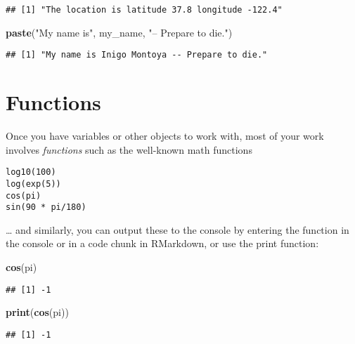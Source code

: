 \documentclass[
]{book}
\newenvironment{Shaded}{\begin{snugshade}}{\end{snugshade}}
\newcommand{\KeywordTok}[1]{\textcolor[rgb]{0.13,0.29,0.53}{\textbf{#1}}}
\newcommand{\NormalTok}[1]{#1}
\newcommand{\StringTok}[1]{\textcolor[rgb]{0.31,0.60,0.02}{#1}}
\begin{document}
\begin{verbatim}
## [1] "The location is latitude 37.8 longitude -122.4"
\end{verbatim}

\begin{Shaded}
\begin{Highlighting}[]
\KeywordTok{paste}\NormalTok{(}\StringTok{"My name is"}\NormalTok{, my_name, }\StringTok{"-- Prepare to die."}\NormalTok{)}
\end{Highlighting}
\end{Shaded}

\begin{verbatim}
## [1] "My name is Inigo Montoya -- Prepare to die."
\end{verbatim}

\hypertarget{functions}{%
\section{Functions}\label{functions}}

Once you have variables or other objects to work with, most of your work
involves \emph{functions} such as the well-known math functions

\begin{verbatim}
log10(100)
log(exp(5))
cos(pi)
sin(90 * pi/180)
\end{verbatim}

\ldots{} and similarly, you can output these to the console by entering the function
in the console or in a code chunk in RMarkdown, or use the print function:

\begin{Shaded}
\begin{Highlighting}[]
\KeywordTok{cos}\NormalTok{(pi)}
\end{Highlighting}
\end{Shaded}

\begin{verbatim}
## [1] -1
\end{verbatim}

\begin{Shaded}
\begin{Highlighting}[]
\KeywordTok{print}\NormalTok{(}\KeywordTok{cos}\NormalTok{(pi))}
\end{Highlighting}
\end{Shaded}

\begin{verbatim}
## [1] -1
\end{verbatim}
\end{document}
